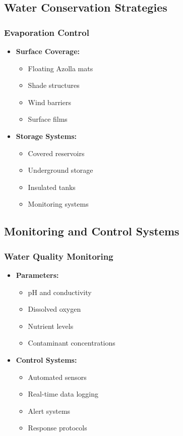 \subsection{Water Conservation Strategies}

\subsubsection{Evaporation Control}
\begin{itemize}
    \item \textbf{Surface Coverage:}
    \begin{itemize}
        \item Floating Azolla mats
        \item Shade structures
        \item Wind barriers
        \item Surface films
    \end{itemize}
    
    \item \textbf{Storage Systems:}
    \begin{itemize}
        \item Covered reservoirs
        \item Underground storage
        \item Insulated tanks
        \item Monitoring systems
    \end{itemize}
\end{itemize}

\subsection{Monitoring and Control Systems}

\subsubsection{Water Quality Monitoring}
\begin{itemize}
    \item \textbf{Parameters:}
    \begin{itemize}
        \item pH and conductivity
        \item Dissolved oxygen
        \item Nutrient levels
        \item Contaminant concentrations
    \end{itemize}
    
    \item \textbf{Control Systems:}
    \begin{itemize}
        \item Automated sensors
        \item Real-time data logging
        \item Alert systems
        \item Response protocols
    \end{itemize}
\end{itemize}

